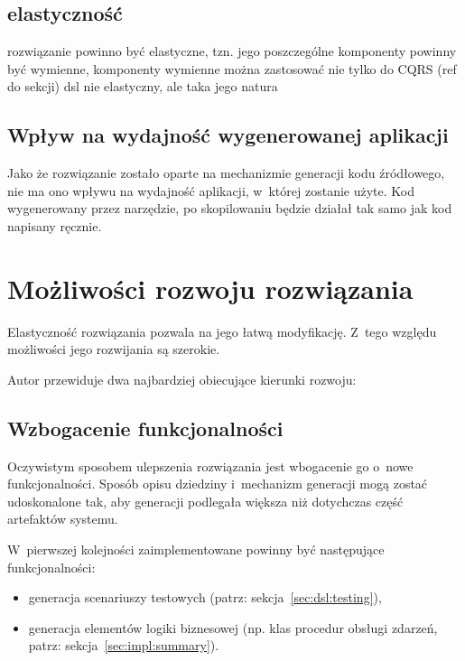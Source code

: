 \subsection{elastyczność}

rozwiązanie powinno być elastyczne, tzn. jego poszczególne komponenty powinny być wymienne,
komponenty wymienne
można zastosować nie tylko do CQRS (ref do sekcji)
dsl nie elastyczny, ale taka jego natura


\subsection{Wpływ na wydajność wygenerowanej aplikacji}

Jako że rozwiązanie zostało oparte na mechanizmie generacji kodu źródłowego, nie ma ono wpływu na wydajność aplikacji, w~której zostanie użyte.
Kod wygenerowany przez narzędzie, po skopilowaniu będzie działał tak samo jak kod napisany ręcznie.



\section{Możliwości rozwoju rozwiązania}

Elastyczność rozwiązania pozwala na jego łatwą modyfikację.
Z~tego względu możliwości jego rozwijania są szerokie.

Autor przewiduje dwa najbardziej obiecujące kierunki rozwoju:


\subsection{Wzbogacenie funkcjonalności}

Oczywistym sposobem ulepszenia rozwiązania jest wbogacenie go o~nowe funkcjonalności.
Sposób opisu dziedziny i~mechanizm generacji mogą zostać udoskonalone tak, aby generacji podlegała większa niż dotychczas część artefaktów systemu.

W~pierwszej kolejności zaimplementowane powinny być następujące funkcjonalności:

\begin{itemize}
 \item generacja scenariuszy testowych (patrz: sekcja~\ref{sec:dsl:testing}),
 \item generacja elementów logiki biznesowej (np. klas procedur obsługi zdarzeń, patrz: sekcja~\ref{sec:impl:summary}).
\end{itemize}



